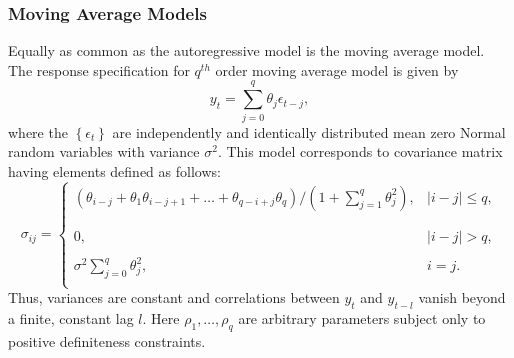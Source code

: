 \subsubsection{Moving Average Models}

Equally as common as the autoregressive model is the moving average model. The response specification for $q^{th}$ order moving average model  is given by 
\begin{equation}\label{eq:ma-q-model}
y_{t} = \sum_{j = 0}^{q} \theta_j \epsilon_{t-j},
\end{equation}
\noindent
where the $\left\{\epsilon_t\right\}$ are independently and identically distributed mean zero Normal random variables with variance $\sigma^2$. This model corresponds to covariance matrix having elements defined as follows:
\begin{equation*}
\sigma_{ij} = \left\{ \begin{array}{ll}
\left(\theta_{i-j} + \theta_{1}\theta_{i-j +1} + \dots + \theta_{q-i+j}\theta_{q}\right)/\left(1 + \sum_{j = 1}^q \theta_j^2\right), & \vert i-j\vert \le q,\\ 
& \\
& \\
0, &  \vert i-j\vert > q, \\
& \\
\sigma^2 \sum\limits_{j = 0}^q \theta_j^2, & i = j.\\
\end{array}\right.
\end{equation*}
\noindent
Thus, variances are constant and correlations between $y_t$ and $y_{t-l}$ vanish beyond a finite, constant lag $l$. Here $\rho_1,\dots, \rho_q$ are arbitrary parameters subject only to positive definiteness constraints. 

\bigskip

